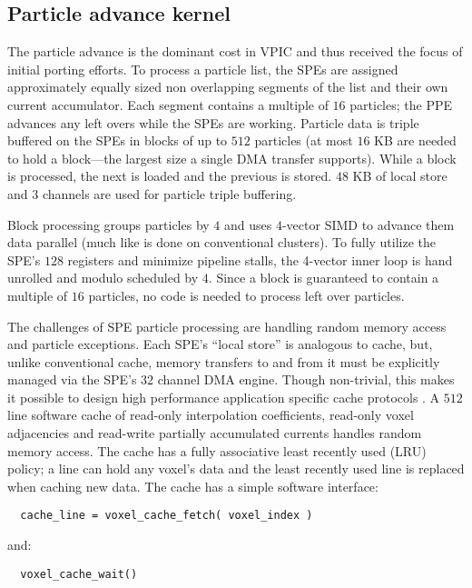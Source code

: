 \documentclass[letter,10pt]{article}
\begin{document}
\subsection{Particle advance kernel}

The particle advance is the dominant cost in VPIC and thus received
the focus of initial porting efforts.  To process a particle list, the
SPEs are assigned approximately equally sized non overlapping segments
of the list and their own current accumulator.  Each segment contains
a multiple of $16$ particles; the PPE advances any left overs while
the SPEs are working.  Particle data is triple buffered on the SPEs in
blocks of up to $512$ particles (at most $16$ KB are needed to hold a
block---the largest size a single DMA transfer supports).  While a
block is processed, the next is loaded and the previous is stored.
$48$ KB of local store and $3$ channels are used for particle triple
buffering.

Block processing groups particles by $4$ and uses $4$-vector SIMD to
advance them data parallel (much like is done on conventional
clusters).  To fully utilize the SPE's $128$ registers and minimize
pipeline stalls, the 4-vector inner loop is hand unrolled and modulo
scheduled by $4$.  Since a block is guaranteed to contain a multiple
of $16$ particles, no code is needed to process left over particles.

The challenges of SPE particle processing are handling random memory
access and particle exceptions.  Each SPE's ``local store'' is
analogous to cache, but, unlike conventional cache, memory transfers
to and from it must be explicitly managed via the SPE's $32$ channel
DMA engine.  Though non-trivial, this makes it possible to design high
performance application specific cache protocols
\cite{Kahle_et_al_2005}.  A $512$ line software cache of read-only
interpolation coefficients, read-only voxel adjacencies and read-write
partially accumulated currents handles random memory access.  The
cache has a fully associative least recently used (LRU) policy; a line
can hold any voxel's data and the least recently used line is replaced
when caching new data.  The cache has a simple software interface:
\begin{verbatim}
  cache_line = voxel_cache_fetch( voxel_index )
\end{verbatim}
and:
\begin{verbatim}
  voxel_cache_wait()
\end{verbatim}
\end{document}
